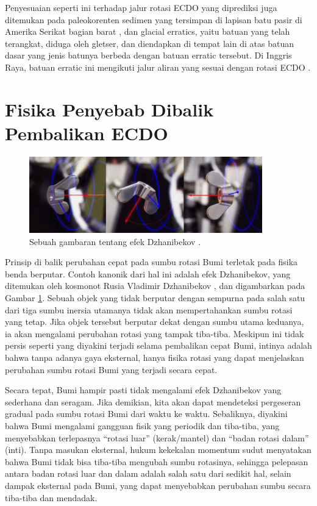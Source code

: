 \documentclass[10pt,twocolumn,letterpaper]{article}
\begin{document}
Penyesuaian seperti ini terhadap jalur rotasi ECDO yang diprediksi juga ditemukan pada paleokorenten sedimen yang tersimpan di lapisan batu pasir di Amerika Serikat bagian barat \cite{21}, dan glacial erratics, yaitu batuan yang telah terangkat, diduga oleh gletser, dan diendapkan di tempat lain di atas batuan dasar yang jenis batunya berbeda dengan batuan erratic tersebut. Di Inggris Raya, batuan erratic ini mengikuti jalur aliran yang sesuai dengan rotasi ECDO \cite{67,68}.

\section{Fisika Penyebab Dibalik Pembalikan ECDO}

\begin{figure}
\begin{center}

\includegraphics[width=0.9\textwidth]{dzhani.jpg}
\end{center}
   \caption{Sebuah gambaran tentang efek Dzhanibekov \cite{28}.}
\label{fig:10}
\end{figure}

Prinsip di balik perubahan cepat pada sumbu rotasi Bumi terletak pada fisika benda berputar. Contoh kanonik dari hal ini adalah efek Dzhanibekov, yang ditemukan oleh kosmonot Rusia Vladimir Dzhanibekov \cite{37}, dan digambarkan pada Gambar \ref{fig:10}. Sebuah objek yang tidak berputar dengan sempurna pada salah satu dari tiga sumbu inersia utamanya tidak akan mempertahankan sumbu rotasi yang tetap. Jika objek tersebut berputar dekat dengan sumbu utama keduanya, ia akan mengalami perubahan rotasi yang tampak tiba-tiba. Meskipun ini tidak persis seperti yang diyakini terjadi selama pembalikan cepat Bumi, intinya adalah bahwa tanpa adanya gaya eksternal, hanya fisika rotasi yang dapat menjelaskan perubahan sumbu rotasi Bumi yang terjadi secara cepat.

Secara tepat, Bumi hampir pasti tidak mengalami efek Dzhanibekov yang sederhana dan seragam. Jika demikian, kita akan dapat mendeteksi pergeseran gradual pada sumbu rotasi Bumi dari waktu ke waktu. Sebaliknya, diyakini bahwa Bumi mengalami gangguan fisik yang periodik dan tiba-tiba, yang menyebabkan terlepasnya “rotasi luar” (kerak/mantel) dan “badan rotasi dalam” (inti). Tanpa masukan eksternal, hukum kekekalan momentum sudut menyatakan bahwa Bumi tidak bisa tiba-tiba mengubah sumbu rotasinya, sehingga pelepasan antara badan rotasi luar dan dalam adalah salah satu dari sedikit hal, selain dampak eksternal pada Bumi, yang dapat menyebabkan perubahan sumbu secara tiba-tiba dan mendadak.
\end{document}
